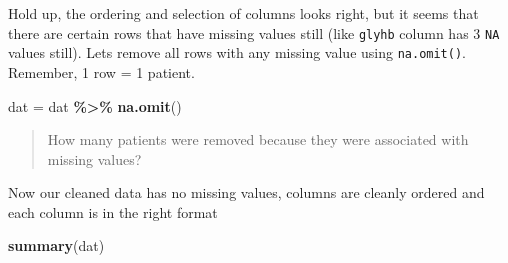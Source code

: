 \documentclass[
]{book}
\newenvironment{Shaded}{\begin{snugshade}}{\end{snugshade}}
\newcommand{\FunctionTok}[1]{\textcolor[rgb]{0.13,0.29,0.53}{\textbf{#1}}}
\newcommand{\NormalTok}[1]{#1}
\newcommand{\OtherTok}[1]{\textcolor[rgb]{0.56,0.35,0.01}{#1}}
\newcommand{\SpecialCharTok}[1]{\textcolor[rgb]{0.81,0.36,0.00}{\textbf{#1}}}
\begin{document}
Hold up, the ordering and selection of columns looks right, but it seems that there are certain rows that have missing values still (like \texttt{glyhb} column has 3 \texttt{NA} values still).
Lets remove all rows with any missing value using \texttt{na.omit()}.
Remember, 1 row = 1 patient.

\begin{Shaded}
\begin{Highlighting}[]
\NormalTok{dat }\OtherTok{=}\NormalTok{ dat }\SpecialCharTok{\%\textgreater{}\%}
  \FunctionTok{na.omit}\NormalTok{()}
\end{Highlighting}
\end{Shaded}

\begin{quote}
How many patients were removed because they were associated with missing values?
\end{quote}

Now our cleaned data has no missing values, columns are cleanly ordered and each column is in the right format

\begin{Shaded}
\begin{Highlighting}[]
\FunctionTok{summary}\NormalTok{(dat)}
\end{Highlighting}
\end{Shaded}
\end{document}
